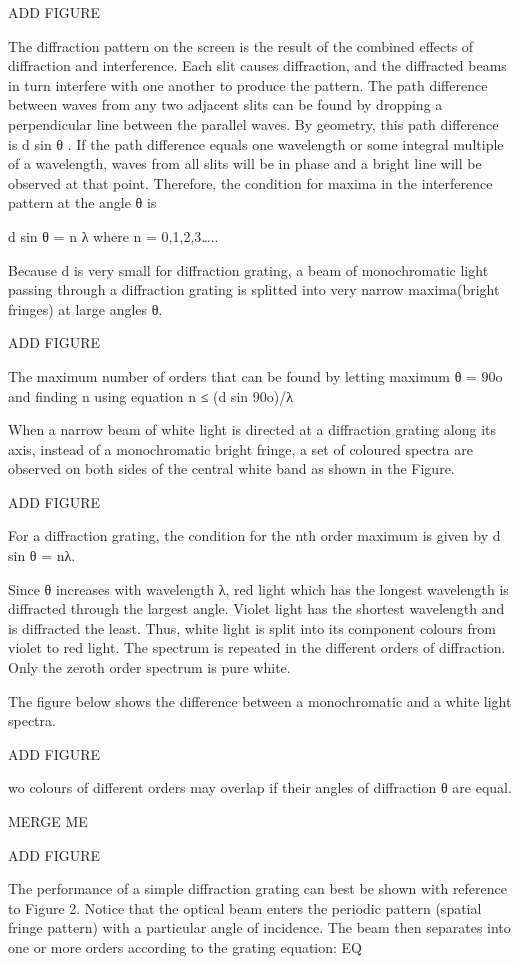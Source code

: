 ADD FIGURE

The diffraction pattern on the screen is the result of the combined effects of diffraction and interference. Each slit causes diffraction, and the diffracted beams in turn interfere with one another to produce the pattern. The path difference between waves from any two adjacent slits can be found by dropping a perpendicular line between the parallel waves. By geometry, this path difference is d sin θ . If the path difference equals one wavelength or some integral multiple of a wavelength, waves from all slits will be in phase and a bright line will be observed at that point. Therefore, the condition for maxima in the interference pattern at the angle θ is 

d sin θ = n λ
where n = 0,1,2,3…..

Because d is very small for diffraction grating, a beam of monochromatic light passing through a diffraction grating is splitted into very narrow maxima(bright fringes) at large angles θ.

ADD FIGURE

The maximum number of orders that can be found by letting maximum θ = 90o and finding n using equation
n ≤ (d sin 90o)/λ

When a narrow beam of white light is directed at a diffraction grating along its axis, instead of a monochromatic bright fringe, a set of coloured spectra are observed on both sides of the central white band as shown in the Figure.

ADD FIGURE

For a diffraction grating, the condition for the nth order maximum is given by d sin θ = nλ.

Since θ increases with wavelength λ, red light which has the longest wavelength is diffracted through the largest angle. Violet light has the shortest wavelength and is diffracted the least. Thus, white light is split into its component colours from violet to red light. The spectrum is repeated in the different orders of diffraction. Only the zeroth order spectrum is pure white.

The figure below shows the difference between a monochromatic and a white light spectra.

ADD FIGURE

wo colours of different orders may overlap if their angles of diffraction θ are equal. 

MERGE ME

ADD FIGURE

The performance of a simple diffraction grating can best be shown with reference to Figure 2. Notice that the optical beam enters the periodic pattern (spatial fringe pattern) with a particular angle of incidence. The beam then separates into one or more orders according to the grating equation: EQ

